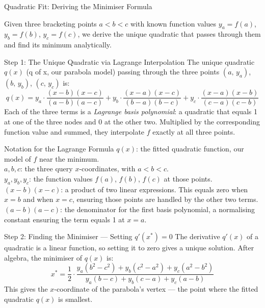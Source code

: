 \documentclass[aspectratio=169,10pt]{beamer}
\begin{document}
\begin{frame}[allowframebreaks]{Quadratic Fit: Deriving the Minimiser Formula}

  Given three bracketing points $a < b < c$ with known function values
  $y_a = f(a)$, $y_b = f(b)$, $y_c = f(c)$, we derive the unique quadratic
  that passes through them and find its minimum analytically.

  \begin{block}{Step 1: The Unique Quadratic via Lagrange Interpolation}
    The unique quadratic $q(x)$ (q of x, our parabola model) passing through
    the three points $(a,\, y_a)$, $(b,\, y_b)$, $(c,\, y_c)$ is:
    \[
      q(x)
      = y_a \cdot \frac{(x-b)(x-c)}{(a-b)(a-c)}
      + y_b \cdot \frac{(x-a)(x-c)}{(b-a)(b-c)}
      + y_c \cdot \frac{(x-a)(x-b)}{(c-a)(c-b)}
    \]
    Each of the three terms is a \emph{Lagrange basis polynomial}: a quadratic
    that equals 1 at one of the three nodes and 0 at the other two.  Multiplied
    by the corresponding function value and summed, they interpolate $f$ exactly
    at all three points.
  \end{block}

  \begin{block}{Notation for the Lagrange Formula}
    $q(x)$: the fitted quadratic function, our model of $f$ near the minimum.\\
    $a, b, c$: the three query $x$-coordinates, with $a < b < c$.\\
    $y_a, y_b, y_c$: the function values $f(a)$, $f(b)$, $f(c)$ at those points.\\
    $(x - b)(x - c)$: a product of two linear expressions.  This equals zero
    when $x = b$ and when $x = c$, ensuring those points are handled by the
    other two terms.\\
    $(a - b)(a - c)$: the denominator for the first basis polynomial, a
    normalising constant ensuring the term equals 1 at $x = a$.
  \end{block}

  \begin{block}{Step 2: Finding the Minimiser --- Setting $q'(x^*) = 0$}
    The derivative $q'(x)$ of a quadratic is a linear function, so setting
    it to zero gives a unique solution.  After algebra, the minimiser of
    $q(x)$ is:
    \[
      x^* = \frac{1}{2}
            \cdot
            \frac{y_a(b^2 - c^2) + y_b(c^2 - a^2) + y_c(a^2 - b^2)}
                 {y_a(b - c)   + y_b(c - a)   + y_c(a - b)}
    \]
    This gives the $x$-coordinate of the parabola's vertex --- the point
    where the fitted quadratic $q(x)$ is smallest.
  \end{block}


\end{frame}
\end{document}
